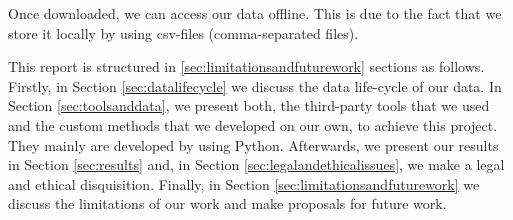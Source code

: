 Once downloaded, we can access our data offline. This is due to the fact that we store it locally by using csv-files (comma-separated files).

This report is structured in \ref{sec:limitationsandfuturework} sections as follows. Firstly, in Section \ref{sec:datalifecycle} we discuss the data life-cycle of our data. In Section  \ref{sec:toolsanddata}, we present both, the third-party tools that we used and the custom methods that we developed on our own, to achieve this project. They mainly are developed by using Python.  Afterwards, we present our results in Section \ref{sec:results} and, in Section \ref{sec:legalandethicalissues}, we make a legal and ethical disquisition. Finally, in Section \ref{sec:limitationsandfuturework} we discuss the limitations of our work and make proposals for future work.